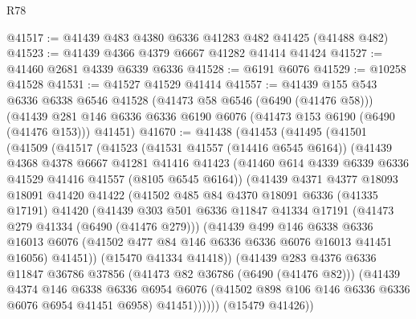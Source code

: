 \begin{lexlean}{R78}
\begin{coremodule}
@41517 := @41439 @483 @4380 @6336 @41283 @482 @41425 (@41488 @482)
@41523 := @41439 @4366 @4379 @6667 @41282 @41414 @41424
@41527 := @41460 @2681 @4339 @6339 @6336
@41528 := @6191 @6076
@41529 := @10258 @41528
@41531 := @41527 @41529 @41414
@41557 := @41439
    @155
    @543
    @6336
    @6338
    @6546
    @41528
    (@41473 @58 @6546 (@6490 (@41476 @58)))
    (@41439 @281 @146 @6336 @6336 @6190 @6076 (@41473 @153 @6190 (@6490 (@41476 @153))) @41451)
@41670 := @41438
    (@41453
      (@41495
        (@41501
          (@41509
            (@41517
              (@41523
                (@41531 @41557 (@14416 @6545 @6164))
                (@41439
                  @4368
                  @4378
                  @6667
                  @41281
                  @41416
                  @41423
                  (@41460 @614 @4339 @6339 @6336 @41529 @41416 @41557 (@8105 @6545 @6164))
                  (@41439
                    @4371
                    @4377
                    @18093
                    @18091
                    @41420
                    @41422
                    (@41502
                      @485
                      @84
                      @4370
                      @18091
                      @6336
                      (@41335 @17191)
                      @41420
                      (@41439
                        @303
                        @501
                        @6336
                        @11847
                        @41334
                        @17191
                        (@41473 @279 @41334 (@6490 (@41476 @279)))
                        (@41439
                          @499
                          @146
                          @6338
                          @6336
                          @16013
                          @6076
                          (@41502 @477 @84 @146 @6336 @6336 @6076 @16013 @41451 @16056)
                          @41451))
                      (@15470 @41334 @41418))
                    (@41439
                      @283
                      @4376
                      @6336
                      @11847
                      @36786
                      @37856
                      (@41473 @82 @36786 (@6490 (@41476 @82)))
                      (@41439
                        @4374
                        @146
                        @6338
                        @6336
                        @6954
                        @6076
                        (@41502 @898 @106 @146 @6336 @6336 @6076 @6954 @41451 @6958)
                        @41451))))))
            (@15479 @41426))

\end{coremodule}
\end{lexlean}
